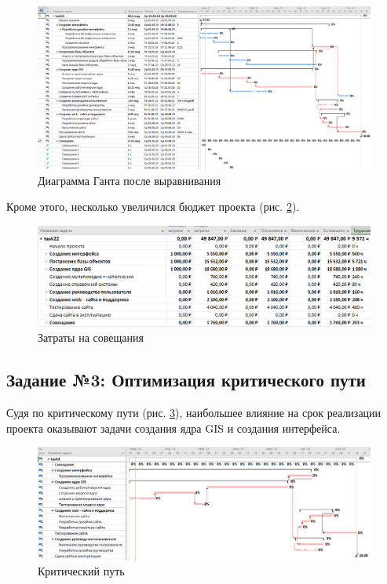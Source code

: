 \begin{figure}[!h]
	\centering
	\includegraphics[width=1\linewidth]{inc/img/5.png}
	\caption{Диаграмма Ганта после выравнивания}
	\label{p5}
\end{figure}
\newpage
Кроме этого, несколько увеличился бюджет проекта (рис. \ref{p6}).

\begin{figure}[!h]
	\centering
	\includegraphics[width=1\linewidth]{inc/img/6.png}
	\caption{Затраты на совещания}
	\label{p6}
\end{figure}

\subsection*{Задание №3: Оптимизация критического пути}

Судя по критическому пути (рис. \ref{p7}), наибольшее влияние на срок реализации проекта оказывают задачи создания ядра GIS и создания интерфейса.

\begin{figure}[!h]
	\centering
	\includegraphics[width=1\linewidth]{inc/img/7.png}
	\caption{Критический путь}
	\label{p7}
\end{figure}

